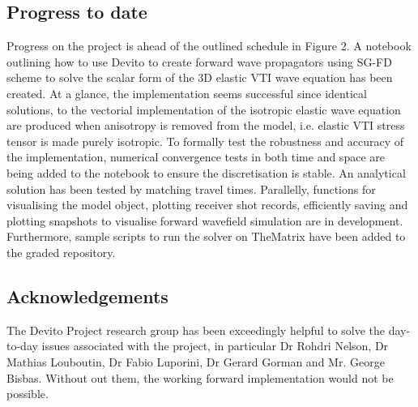 \subsection{Progress to date}
Progress on the project is ahead of the outlined schedule in Figure 2. A notebook outlining how to use Devito to create forward wave propagators using SG-FD scheme to solve the scalar form of the 3D elastic VTI wave equation has been created. At a glance, the implementation seems successful since identical solutions, to the vectorial implementation of the isotropic elastic wave equation are produced when anisotropy is removed from the model, i.e. elastic VTI stress tensor is made purely isotropic. To formally test the robustness and accuracy of the implementation, numerical convergence tests in both time and space are being added to the notebook to ensure the discretisation is stable. An analytical solution has been tested by matching travel times. Parallelly, functions for visualising the model object, plotting receiver shot records, efficiently saving and plotting snapshots to visualise forward wavefield simulation are in development. Furthermore, sample scripts to run the solver on TheMatrix have been added to the graded repository.
\\
\subsection{Acknowledgements}
The Devito Project research group has been exceedingly helpful to solve the day-to-day issues associated with the project, in particular Dr Rohdri Nelson, Dr Mathias Louboutin, Dr Fabio Luporini, Dr Gerard Gorman and Mr. George Bisbas. Without out them, the working forward implementation would not be possible.

